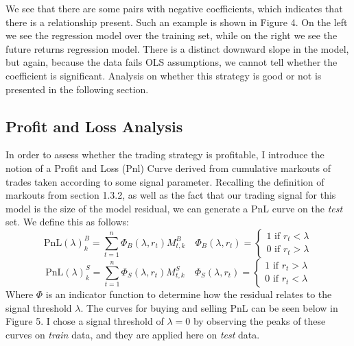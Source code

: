 \documentclass{article}
\begin{document}
We see that there are some pairs with negative coefficients, which indicates that 
there is a relationship present. Such an example is shown in Figure 4. On the left
we see the regression model over the training set, while on the right we see the 
future returns regression model. There is a distinct downward slope in the model, but 
again, because the data fails OLS assumptions, we cannot tell whether the coefficient
is significant. Analysis on whether this strategy is good or not is presented in the
following section.

\subsection{Profit and Loss Analysis}
In order to assess whether the trading strategy is profitable, I introduce the notion
of a Profit and Loss (Pnl) Curve derived from cumulative markouts of trades taken
according to some signal parameter. Recalling the definition of markouts from section
1.3.2, as well as the fact that our trading signal for this model is the size 
of the model residual, we can generate a PnL curve on the \textit{test} set.
We define this as follows:
$$\mathrm{PnL}(\lambda)_k^B = \sum_{t=1}^n \Phi_B(\lambda, r_t) M_{t,k}^B
\quad
\Phi_B(\lambda, r_t) = \begin{cases}
  1 \text { if } r_t < \lambda\\
  0 \text { if } r_t > \lambda  
\end{cases}$$
$$\mathrm{PnL}(\lambda)_k^S = \sum_{t=1}^n \Phi_S(\lambda, r_t) M_{t,k}^S
\quad
\Phi_S(\lambda, r_t) = \begin{cases}
  1 \text { if } r_t > \lambda\\
  0 \text { if } r_t < \lambda  
\end{cases}$$
Where $\Phi$ is an indicator function to determine how the residual relates to the
signal threshold $\lambda$. The curves for buying and selling PnL can be seen below
in Figure 5. I chose a signal threshold of $\lambda=0$ by observing the peaks
of these curves on \textit{train} data, and they are applied here on \textit{test}
data.
\end{document}
